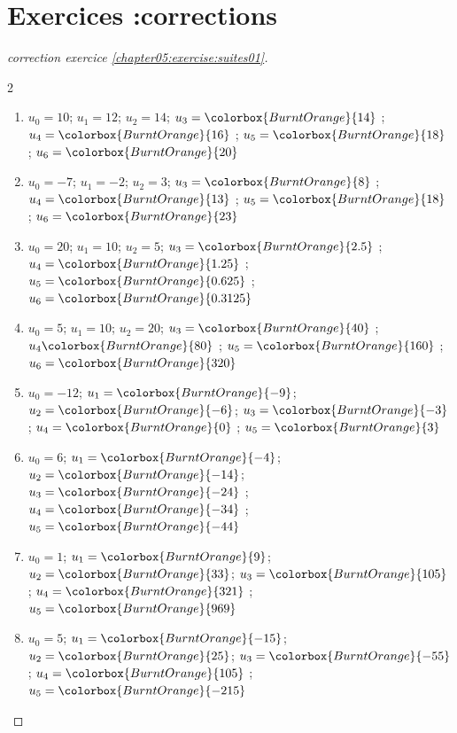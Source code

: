 \documentclass[main.tex]{subfiles}
\begin{document}
\section{Exercices :corrections}
  
\begin{proof}[correction exercice \ref{chapter05:exercise:suites01}] \hfill 
	\begin{spacing}{2}
\begin{enumerate}[label=\alph*),leftmargin=*]
	\item $u_0=10$; $u_1=12$; $u_2=14$; $u_3=\colorbox{BurntOrange}{14} $ ; $u_4=\colorbox{BurntOrange}{16}$ ; $u_5=\colorbox{BurntOrange}{18}$ ; $u_6=\colorbox{BurntOrange}{20}$ \hfill {}
	\item $u_0=-7$; $u_1=-2$; $u_2=3$; $u_3=\colorbox{BurntOrange}{8}$ ; $u_4=\colorbox{BurntOrange}{13}$  ; $u_5=\colorbox{BurntOrange}{18}$ ; $u_6=\colorbox{BurntOrange}{23}$\hfill \hfill {} 
	\item $u_0=20$; $u_1=10$; $u_2=5$; $u_3=\colorbox{BurntOrange}{2.5}$ ; $u_4=\colorbox{BurntOrange}{1.25}$  ; $u_5=\colorbox{BurntOrange}{0.625}$ ; $u_6=\colorbox{BurntOrange}{0.3125}$\hfill \hfill {}
	\item $u_0=5$; $u_1=10$; $u_2=20$; $u_3=\colorbox{BurntOrange}{40}$ ; $u_4\colorbox{BurntOrange}{80}$  ; $u_5=\colorbox{BurntOrange}{160}$ ; $u_6=\colorbox{BurntOrange}{320}$\hfill \hfill  {}
	\item $u_0=-12$; $u_1=\colorbox{BurntOrange}{-9}$; $u_2=\colorbox{BurntOrange}{-6}$; $u_3=\colorbox{BurntOrange}{-3}$ ; $u_4=\colorbox{BurntOrange}{0}$  ; $u_5=\colorbox{BurntOrange}{3}$   \hfill \hfill  {}
	\item $u_0=6$; $u_1=\colorbox{BurntOrange}{-4}$; $u_2=\colorbox{BurntOrange}{-14}$; $u_3=\colorbox{BurntOrange}{-24}$ ; $u_4=\colorbox{BurntOrange}{-34}$  ; $u_5=\colorbox{BurntOrange}{-44}$   \hfill \hfill  {}
	\item $u_0=1$; $u_1=\colorbox{BurntOrange}{9}$; $u_2=\colorbox{BurntOrange}{33}$; $u_3=\colorbox{BurntOrange}{105}$ ; $u_4=\colorbox{BurntOrange}{321}$  ; $u_5=\colorbox{BurntOrange}{969}$   \hfill \hfill  {}
	\item $u_0=5$; $u_1=\colorbox{BurntOrange}{-15}$; $u_2=\colorbox{BurntOrange}{25}$; $u_3=\colorbox{BurntOrange}{-55}$ ; $u_4=\colorbox{BurntOrange}{105}$  ; $u_5=\colorbox{BurntOrange}{-215}$   \hfill \hfill {}
\end{enumerate} 
\end{spacing}\vspace{-0.5em}
\end{proof}
\end{document}
